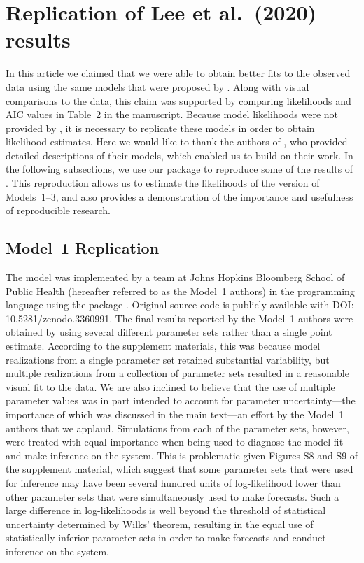 \section{Replication of Lee et al.~(2020) results}\label{sec:appendix_haiti_lee20}

In this article we claimed that we were able to obtain better fits to the observed data using the same models that were proposed by \citet{lee20}.
Along with visual comparisons to the data, this claim was supported by comparing likelihoods and AIC values in Table~2 in the manuscript.
Because model likelihoods were not provided by \citet{lee20}, it is necessary to replicate these models in order to obtain likelihood estimates.
Here we would like to thank the authors of \citet{lee20}, who provided detailed descriptions of their models, which enabled us to build on their work.
In the following subsections, we use our  package  to reproduce some of the results of \citet{lee20}.
This reproduction allows us to estimate the likelihoods of the \citet{lee20} version of Models~1--3, and also provides a demonstration of the importance and usefulness of reproducible research.

\subsection{Model~1 Replication}

The model was implemented by a team at Johns Hopkins Bloomberg School of Public Health (hereafter referred to as the Model~1 authors) in the  programming language using the  package \citep{king16}.
Original source code is publicly available with DOI: 10.5281/zenodo.3360991.
The final results reported by the Model~1 authors were obtained by using several different parameter sets rather than a single point estimate.
According to the supplement materials, this was because model realizations from a single parameter set retained substantial variability, but multiple realizations from a collection of parameter sets resulted in a reasonable visual fit to the data.
We are also inclined to believe that the use of multiple parameter values was in part intended to account for parameter uncertainty---the importance of which was discussed in the main text---an effort by the Model~1 authors that we applaud.
Simulations from each of the parameter sets, however, were treated with equal importance when being used to diagnose the model fit and make inference on the system.
This is problematic given Figures S8 and S9 of the supplement material, which suggest that some parameter sets that were used for inference may have been several hundred units of log-likelihood lower than other parameter sets that were simultaneously used to make forecasts.
Such a large difference in log-likelihoods is well beyond the threshold of statistical uncertainty determined by Wilks' theorem, resulting in the equal use of statistically inferior parameter sets in order to make forecasts and conduct inference on the system.


